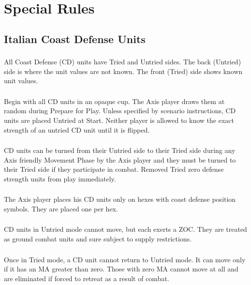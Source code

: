 \section{Special Rules}

\subsection{Italian Coast Defense Units}

\subsubsection{} All Coast Defense (CD) units have Tried and Untried sides. The back (Untried) side is where the unit values are not known. The front (Tried) side shows known unit values.

\subsubsection{} Begin with all CD units in an opaque cup. The Axis player draws them at random during Prepare for Play. Unless specified by scenario instructions, CD units are placed Untried at Start. Neither player is allowed to know the exact strength of an untried CD unit until it is flipped.

\subsubsection{} CD units can be turned from their Untried side to their Tried side during any Axis friendly Movement Phase by the Axis player and they must be turned to their Tried side if they participate in combat. Removed Tried zero defense strength units from play immediately.

\subsubsection{} The Axis player places his CD units only on hexes with coast defense position symbols. They are placed one per hex.

\subsubsection{} CD units in Untried mode cannot move, but each exerts a ZOC. They are treated as ground combat units and sure subject to supply restrictions.

\subsubsection{} Once in Tried mode, a CD unit cannot return to Untried mode. It can move only if it has an MA greater than zero. Those with zero MA cannot move at all and are eliminated if forced to retreat as a result of combat.

